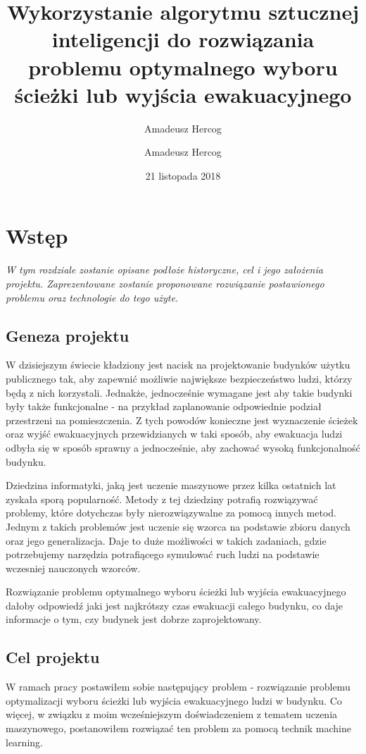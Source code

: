 \documentclass[12pt]{aghdpl}
\author{Amadeusz Hercog}
\title{Wykorzystanie algorytmu sztucznej inteligencji do rozwiązania problemu optymalnego wyboru ścieżki lub wyjścia ewakuacyjnego}
\author{Amadeusz Hercog}
\date{21 listopada 2018}
\begin{document}
	\titlepages
	
	\chapter{Wstęp}
	\textit{W tym rozdziale zostanie opisane podłoże historyczne, cel i jego założenia projektu. Zaprezentowane zostanie proponowane rozwiązanie postawionego problemu oraz technologie do tego użyte.}
	
		\section{Geneza projektu}	
		W dzisiejszym świecie kładziony jest nacisk na projektowanie budynków użytku publicznego tak, aby zapewnić możliwie największe bezpieczeństwo ludzi, którzy będą z nich korzystali. Jednakże, jednocześnie wymagane jest aby takie budynki były także funkcjonalne - na przykład zaplanowanie odpowiednie podział przestrzeni na pomieszczenia. Z tych powodów konieczne jest wyznaczenie ścieżek oraz wyjść ewakuacyjnych przewidzianych w taki sposób, aby ewakuacja ludzi odbyła się w sposób sprawny a jednocześnie, aby zachować wysoką funkcjonalność budynku.
		
		Dziedzina informatyki, jaką jest uczenie maszynowe przez kilka ostatnich lat zyskała sporą popularność. Metody z tej dziedziny potrafią rozwiązywać problemy, które dotychczas były nierozwiązywalne za pomocą innych metod. Jednym z takich problemów jest uczenie się wzorca na podstawie zbioru danych oraz jego generalizacja. Daje to duże możliwości w takich zadaniach, gdzie potrzebujemy narzędzia potrafiącego symulować ruch ludzi na podstawie wczesniej nauczonych wzorców.
		
		Rozwiązanie problemu optymalnego wyboru ścieżki lub wyjścia ewakuacyjnego dałoby odpowiedź jaki jest najkrótszy czas ewakuacji całego budynku, co daje informacje o tym, czy budynek jest dobrze zaprojektowany.
	
		\section{Cel projektu}	
		 W ramach pracy postawiłem sobie następujący problem - rozwiązanie problemu optymalizacji wyboru ścieżki lub wyjścia ewakuacyjnego ludzi w budynku. Co więcej, w związku z moim wcześniejszym doświadczeniem z tematem uczenia maszynowego, postanowiłem rozwiązać ten problem za pomocą technik machine learning.
		
\end{document}
